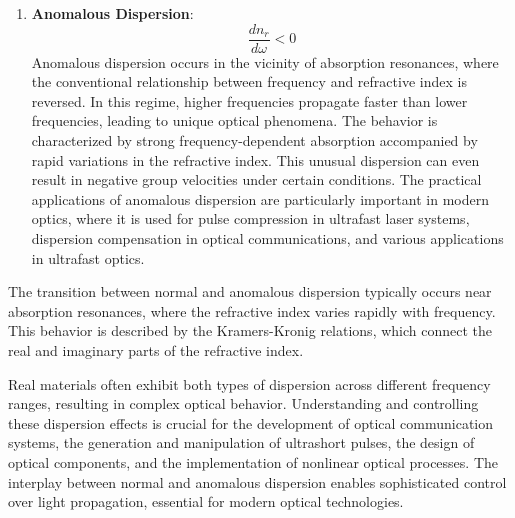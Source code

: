 \documentclass[
  a4paper,
]{book}
\providecommand{\tightlist}{%
  \setlength{\itemsep}{0pt}\setlength{\parskip}{0pt}}
\begin{document}
\begin{enumerate}
\def\labelenumi{\arabic{enumi}.}
\setcounter{enumi}{1}
\tightlist
\item
  \textbf{Anomalous Dispersion}: \[
  \frac{dn_r}{d\omega}<0
  \] Anomalous dispersion occurs in the vicinity of absorption
  resonances, where the conventional relationship between frequency and
  refractive index is reversed. In this regime, higher frequencies
  propagate faster than lower frequencies, leading to unique optical
  phenomena. The behavior is characterized by strong frequency-dependent
  absorption accompanied by rapid variations in the refractive index.
  This unusual dispersion can even result in negative group velocities
  under certain conditions. The practical applications of anomalous
  dispersion are particularly important in modern optics, where it is
  used for pulse compression in ultrafast laser systems, dispersion
  compensation in optical communications, and various applications in
  ultrafast optics.
\end{enumerate}

\begin{tcolorbox}[enhanced jigsaw, coltitle=black, title=\textcolor{quarto-callout-important-color}{\faExclamation}\hspace{0.5em}{Important}, colframe=quarto-callout-important-color-frame, toprule=.15mm, opacitybacktitle=0.6, left=2mm, opacityback=0, breakable, toptitle=1mm, bottomtitle=1mm, leftrule=.75mm, arc=.35mm, titlerule=0mm, colbacktitle=quarto-callout-important-color!10!white, rightrule=.15mm, bottomrule=.15mm, colback=white]

The transition between normal and anomalous dispersion typically occurs
near absorption resonances, where the refractive index varies rapidly
with frequency. This behavior is described by the Kramers-Kronig
relations, which connect the real and imaginary parts of the refractive
index.

\end{tcolorbox}

Real materials often exhibit both types of dispersion across different
frequency ranges, resulting in complex optical behavior. Understanding
and controlling these dispersion effects is crucial for the development
of optical communication systems, the generation and manipulation of
ultrashort pulses, the design of optical components, and the
implementation of nonlinear optical processes. The interplay between
normal and anomalous dispersion enables sophisticated control over light
propagation, essential for modern optical technologies.
\end{document}

